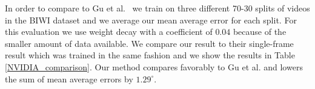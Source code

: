 \documentclass[10pt,twocolumn,letterpaper]{article}
\begin{document}
In order to compare to Gu et al.~\cite{nvidia} we train on three different 70-30 splits of videos in the BIWI dataset and we average our mean average error for each split. For this evaluation we use weight decay with a coefficient of $0.04$ because of the smaller amount of data available. We compare our result to their single-frame result which was trained in the same fashion and we show the results in Table \ref{NVIDIA_comparison}. Our method compares favorably to Gu et al. and lowers the sum of mean average errors by $1.29^\circ$.

\begin{table}[]
\centering
{}
\caption{Mean average error of Euler angles across different methods on the AFLW2000 dataset~\cite{zhu2016face}.}
\label{raw_performance_AFLW2000}
\end{table}
\end{document}
